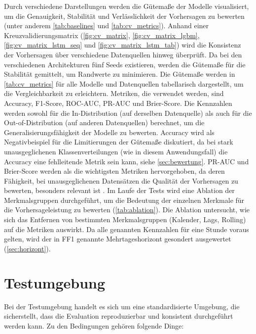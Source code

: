 Durch verschiedene Darstellungen werden die Gütemaße der Modelle visualisiert, um die Genauigkeit, Stabilität und Verlässlichkeit der Vorhersagen zu bewerten (unter anderem \cref{tab:baselines} und \cref{tab:cv_metrics}). Anhand einer Kreuzvalidierungsmatrix (\cref{fig:cv_matrix}, \cref{fig:cv_matrix_lgbm}, \cref{fig:cv_matrix_lstm_seq} und \cref{fig:cv_matrix_lstm_tab}) wird die Konsistenz der Vorhersagen über verschiedene Datenquellen hinweg überprüft. Da bei den verschiedenen Architekturen fünf Seeds existieren, werden die Gütemaße für die Stabilität gemittelt, um Randwerte zu minimieren. Die Gütemaße werden in \cref{tab:cv_metrics} für alle Modelle und Datenquellen tabellarisch dargestellt, um die Vergleichbarkeit zu erleichtern. Metriken, die verwendet werden, sind Accuracy, F1-Score, ROC-AUC, PR-AUC und Brier-Score. Die Kennzahlen werden sowohl für die In-Distribution (auf derselben Datenquelle) als auch für die Out-of-Distribution (auf anderen Datenquellen) berechnet, um die Generalisierungsfähigkeit der Modelle zu bewerten. Accuracy wird als Negativbeispiel für die Limitierungen der Gütemaße diskutiert, da bei stark unausgeglichenen Klassenverteilungen (wie in diesem Anwendungsfall) die Accuracy eine fehlleitende Metrik sein kann, siehe \cref{sec:bewertung}. PR-AUC und Brier-Score werden als die wichtigsten Metriken hervorgehoben, da deren Fähigkeit, bei unausgeglichenen Datensätzen die Qualität der Vorhersagen zu bewerten, besonders relevant ist \parencite{davis2006relationship,saito2015prauc,gneiting2007scoring}. Im Laufe der Tests wird eine Ablation der Merkmalsgruppen durchgeführt, um die Bedeutung der einzelnen Merkmale für die Vorhersageleistung zu bewerten (\cref{tab:ablation}). Die Ablation untersucht, wie sich das Entfernen von bestimmten Merkmalsgruppen (Kalender, Lags, Rolling) auf die Metriken auswirkt. Da alle genannten Kennzahlen für eine Stunde voraus gelten, wird der in FF1 genannte Mehrtageshorizont gesondert ausgewertet (\cref{sec:horizont}).

\section{Testumgebung}
\label{sec:testumgebung}

Bei der Testumgebung handelt es sich um eine standardisierte Umgebung, die sicherstellt, dass die Evaluation reproduzierbar und konsistent durchgeführt werden kann. Zu den Bedingungen gehören folgende Dinge:

